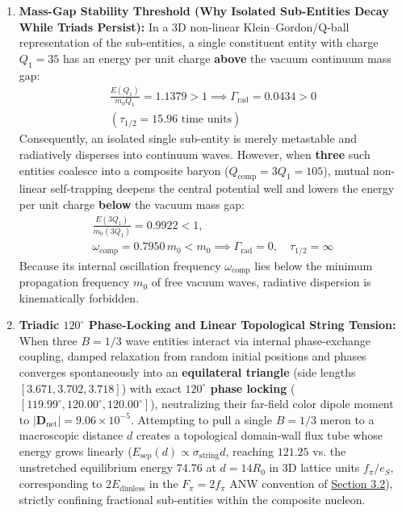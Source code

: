 \documentclass[10pt,aps,prd,twocolumn,superscriptaddress,nofootinbib,floatfix,longbibliography,showkeys]{revtex4-2}
\begin{document}
\begin{enumerate}
  \item \textbf{Mass-Gap Stability Threshold (Why Isolated Sub-Entities Decay While Triads Persist):} In a 3D non-linear Klein--Gordon/Q-ball representation of the sub-entities, a single constituent entity with charge $Q_1 = 35$ has an energy per unit charge \textbf{above} the vacuum continuum mass gap:
\begin{equation}\begin{gathered}
\frac{E(Q_1)}{m_0 Q_1} = 1.1379 > 1 \implies \Gamma_{\text{rad}} = 0.0434 > 0 \\
(\tau_{1/2} = 15.96\text{ time units})
\end{gathered}\end{equation}
  Consequently, an isolated single sub-entity is merely metastable and radiatively disperses into continuum waves. However, when \textbf{three} such entities coalesce into a composite baryon ($Q_{\text{comp}} = 3Q_1 = 105$), mutual non-linear self-trapping deepens the central potential well and lowers the energy per unit charge \textbf{below} the vacuum mass gap:
\begin{equation}\begin{gathered}
\frac{E(3Q_1)}{m_0 (3Q_1)} = 0.9922 < 1, \\
\omega_{\text{comp}} = 0.7950\,m_0 < m_0 \implies \Gamma_{\text{rad}} = 0, \quad \tau_{1/2} = \infty
\end{gathered}\end{equation}
  Because its internal oscillation frequency $\omega_{\text{comp}}$ lies below the minimum propagation frequency $m_0$ of free vacuum waves, radiative dispersion is kinematically forbidden.
  \item \textbf{Triadic $120^\circ$ Phase-Locking and Linear Topological String Tension:} When three $B=1/3$ wave entities interact via internal phase-exchange coupling, damped relaxation from random initial positions and phases converges spontaneously into an \textbf{equilateral triangle} (side lengths $[3.671, 3.702, 3.718]$) with exact \textbf{$120^\circ$ phase locking} ($[119.99^\circ, 120.00^\circ, 120.00^\circ]$), neutralizing their far-field color dipole moment to $|\mathbf{D}_{\text{net}}| = 9.06 \times 10^{-5}$. Attempting to pull a single $B=1/3$ meron to a macroscopic distance $d$ creates a topological domain-wall flux tube whose energy grows linearly ($E_{\text{sep}}(d) \propto \sigma_{\text{string}} d$, reaching $121.25$ vs. the unstretched equilibrium energy $74.76$ at $d = 14 R_0$ in 3D lattice units $f_\pi/e_S$, corresponding to $2 E_{\text{dimless}}$ in the $F_\pi = 2f_\pi$ ANW convention of \hyperref[sec:3.2]{Section 3.2}), strictly confining fractional sub-entities within the composite nucleon.

\end{enumerate}
\end{document}
